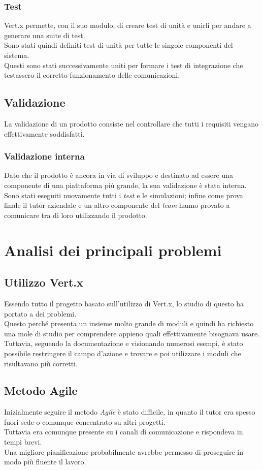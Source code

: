       \subsubsection{Test}
        Vert.x permette, con il suo modulo, di creare test di unità e unirli per andare a generare una suite di test.\\
        Sono stati quindi definiti test di unità per tutte le singole componenti del sistema.\\
        Questi sono stati successivamente uniti per formare i test di integrazione che testassero il corretto funzionamento delle comunicazioni.
    \subsection{Validazione}
      La validazione di un prodotto consiste nel controllare che tutti i requisiti vengano effettivamente soddisfatti.
      \subsubsection{Validazione interna}
        Dato che il prodotto è ancora in via di sviluppo e destinato ad essere una componente di una piattaforma più grande, la sua validazione è stata interna.\\
        Sono stati eseguiti nuovamente tutti i \textit{test} e le simulazioni; infine come prova finale il tutor aziendale e un altro componente del \textit{team} hanno provato a comunicare tra di loro utilizzando il prodotto.
  \section{Analisi dei principali problemi}
    \subsection{Utilizzo Vert.x}
      Essendo tutto il progetto basato sull'utilizzo di Vert.x, lo studio di questo  ha portato a dei problemi.\\
      Questo perché presenta un insieme molto grande di moduli e quindi ha richiesto una mole di studio per comprendere appieno quali effettivamente bisognava usare.\\
      Tuttavia, seguendo la documentazione e visionando numerosi esempi, è stato possibile  restringere il campo d'azione e trovare e poi utilizzare i moduli che risultavano più corretti.
    \subsection{Metodo Agile}
      Inizialmente seguire il metodo \textit{Agile} è stato difficile, in quanto il tutor era spesso fuori sede o comunque concentrato su altri progetti.\\
      Tuttavia era comunque presente su i canali di comunicazione e rispondeva in tempi brevi.\\
      Una migliore pianificazione probabilmente avrebbe permesso di proseguire in modo più fluente il lavoro.
      \newpage
      \null
      \thispagestyle{empty}

